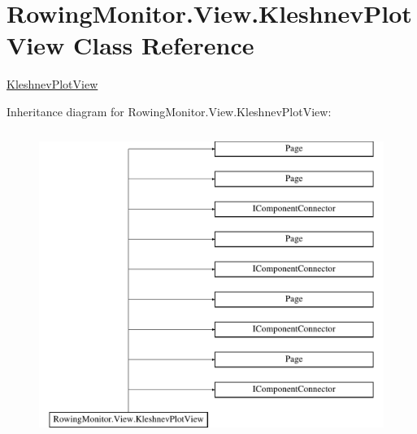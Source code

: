 \hypertarget{class_rowing_monitor_1_1_view_1_1_kleshnev_plot_view}{}\section{Rowing\+Monitor.\+View.\+Kleshnev\+Plot\+View Class Reference}
\label{class_rowing_monitor_1_1_view_1_1_kleshnev_plot_view}


\hyperlink{class_rowing_monitor_1_1_view_1_1_kleshnev_plot_view}{Kleshnev\+Plot\+View}  


Inheritance diagram for Rowing\+Monitor.\+View.\+Kleshnev\+Plot\+View\+:\begin{figure}[H]
\begin{center}
\leavevmode
\includegraphics[height=10.000000cm]{class_rowing_monitor_1_1_view_1_1_kleshnev_plot_view}
\end{center}
\end{figure}
